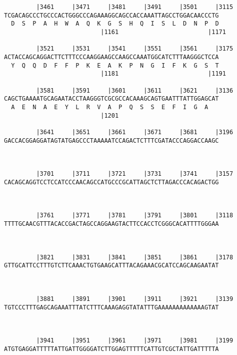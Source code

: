 \documentclass{article}
\begin{document}
\begin{Verbatim}
         |3461     |3471     |3481     |3491     |3501     |3115
TCGACAGCCCTGCCCACTGGGCCCAGAAAGGCAGCCACCAAATTAGCCTGGACAACCCTG
  D  S  P  A  H  W  A  Q  K  G  S  H  Q  I  S  L  D  N  P  D
                           |1161                         |1171
   
         |3521     |3531     |3541     |3551     |3561     |3175
ACTACCAGCAGGACTTCTTTCCCAAGGAAGCCAAGCCAAATGGCATCTTTAAGGGCTCCA
  Y  Q  Q  D  F  F  P  K  E  A  K  P  N  G  I  F  K  G  S  T
                           |1181                         |1191
   
         |3581     |3591     |3601     |3611     |3621     |3136
CAGCTGAAAATGCAGAATACCTAAGGGTCGCGCCACAAAGCAGTGAATTTATTGGAGCAT
  A  E  N  A  E  Y  L  R  V  A  P  Q  S  S  E  F  I  G  A   
                           |1201                          
   
         |3641     |3651     |3661     |3671     |3681     |3196
GACCACGGAGGATAGTATGAGCCCTAAAAATCCAGACTCTTTCGATACCCAGGACCAAGC
                                                            
                                                            
   
         |3701     |3711     |3721     |3731     |3741     |3157
CACAGCAGGTCCTCCATCCCAACAGCCATGCCCGCATTAGCTCTTAGACCCACAGACTGG
                                                            
                                                            
   
         |3761     |3771     |3781     |3791     |3801     |3118
TTTTGCAACGTTTACACCGACTAGCCAGGAAGTACTTCCACCTCGGGCACATTTTGGGAA
                                                            
                                                            
   
         |3821     |3831     |3841     |3851     |3861     |3178
GTTGCATTCCTTTGTCTTCAAACTGTGAAGCATTTACAGAAACGCATCCAGCAAGAATAT
                                                            
                                                            
   
         |3881     |3891     |3901     |3911     |3921     |3139
TGTCCCTTTGAGCAGAAATTTATCTTTCAAAGAGGTATATTTGAAAAAAAAAAAAAGTAT
                                                            
                                                            
   
         |3941     |3951     |3961     |3971     |3981     |3199
ATGTGAGGATTTTTATTGATTGGGGATCTTGGAGTTTTTCATTGTCGCTATTGATTTTTA
                                                            

\end{Verbatim}
\end{document}
